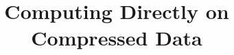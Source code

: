 \documentclass[preprint,nocopyrightspace]{sigplanconf}
\begin{document}


\title{Computing Directly on Compressed Data}

\authorinfo{}


\maketitle

\begin{abstract}

\end{abstract}










%



\end{document}
